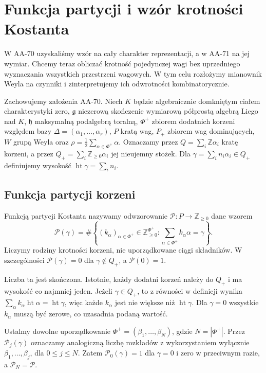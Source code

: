 \chapter{Funkcja partycji i wzór krotności Kostanta}
\label{aa:ch:kostant-multiplicity}

W AA-70 uzyskaliśmy wzór na cały charakter reprezentacji, a w AA-71 na jej wymiar. Chcemy teraz obliczać krotność pojedynczej wagi bez uprzedniego wyznaczania wszystkich przestrzeni wagowych. W tym celu rozłożymy mianownik Weyla na czynniki i zinterpretujemy ich odwrotności kombinatorycznie.

Zachowujemy założenia AA-70. Niech $K$ będzie algebraicznie domkniętym ciałem charakterystyki zero, $\mathfrak g$ niezerową skończenie wymiarową półprostą algebrą Liego nad $K$, $\mathfrak h$ maksymalną podalgebrą toralną, $\Phi^+$ zbiorem dodatnich korzeni względem bazy $\Delta=(\alpha_1,\ldots,\alpha_r)$, $P$ kratą wag, $P_+$ zbiorem wag dominujących, $W$ grupą Weyla oraz $\rho=\frac12\sum_{\alpha\in\Phi^+}\alpha$. Oznaczamy przez $Q=\sum_i\mathbb Z\alpha_i$ kratę korzeni, a przez $Q_+=\sum_i\mathbb Z_{\ge0}\alpha_i$ jej nieujemny stożek. Dla $\gamma=\sum_i n_i\alpha_i\in Q_+$ definiujemy wysokość $\operatorname{ht}\gamma=\sum_i n_i$.

\section{Funkcja partycji korzeni}

\begin{definicja}
\label{aa:def:kostant-partition}
Funkcją partycji Kostanta nazywamy odwzorowanie $\mathcal P:P\to\mathbb Z_{\ge0}$ dane wzorem
\[
 \mathcal P(\gamma)=
 \#\left\{(k_\alpha)_{\alpha\in\Phi^+}\in
 \mathbb Z_{\ge0}^{\Phi^+}:
 \sum_{\alpha\in\Phi^+}k_\alpha\alpha=\gamma\right\}.
\]
Liczymy rodziny krotności korzeni, nie uporządkowane ciągi składników. W szczególności $\mathcal P(\gamma)=0$ dla $\gamma\notin Q_+$, a $\mathcal P(0)=1$.
\end{definicja}
Liczba ta jest skończona. Istotnie, każdy dodatni korzeń należy do $Q_+$ i ma wysokość co najmniej jeden. Jeżeli $\gamma\in Q_+$, to z równości w definicji wynika
$\sum_\alpha k_\alpha\operatorname{ht}\alpha=\operatorname{ht}\gamma$,
więc każde $k_\alpha$ jest nie większe niż $\operatorname{ht}\gamma$. Dla $\gamma=0$ wszystkie $k_\alpha$ muszą być zerowe, co uzasadnia podaną wartość.

Ustalmy dowolne uporządkowanie $\Phi^+=(\beta_1,\ldots,\beta_N)$, gdzie $N=|\Phi^+|$. Przez $\mathcal P_j(\gamma)$ oznaczamy analogiczną liczbę rozkładów z wykorzystaniem wyłącznie $\beta_1,\ldots,\beta_j$, dla $0\le j\le N$. Zatem $\mathcal P_0(\gamma)=1$ dla $\gamma=0$ i zero w przeciwnym razie, a $\mathcal P_N=\mathcal P$.

